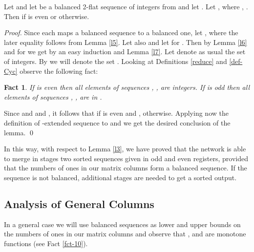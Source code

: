\documentclass{llncs}
\newtheorem{fact}[theorem]{Fact}
\begin{document}
\begin{lemma}
Let  and let  be a balanced
2-flat sequence of integers from  and let
. Let , where , . Then 
 if  is even or  otherwise.
\end{lemma}
\begin{proof}
Since each  maps a balanced sequence to a balanced one, let , where the later
equality follows from Lemma \ref{l5}. Let also  and let 
for . Then  by Lemma \ref{l6}
and for  we get  by an easy
induction and Lemma \ref{l7}. Let  denote as usual the set of 
integers. By  we will denote the set 
. Looking at Definitions \ref{reduce} and 
\ref{def-Cyc} observe the 
following fact:
\begin{fact}
If  is even then all elements of sequences , , are integers. If  is odd then  all elements of sequences 
, , are in .
\end{fact}
Since  and  and , it follows that  if  is 
even and  , otherwise. Applying now 
the definition of -extended sequence to  and  
we get the desired conclusion of the lemma. \qed
\end{proof}

In this way, with respect to Lemma \ref{l3}, we have proved that the network 
 is able to merge in  stages two sorted sequences given in odd 
and even registers, provided that the numbers of ones in our matrix columns 
form a balanced sequence. If the sequence is not balanced,  additional 
stages are needed to get a sorted output.

\subsection{Analysis of General Columns}

In a general case we will use balanced sequences as lower and upper bounds on
the numbers of ones in our matrix columns and observe that , 
and  are monotone functions (see Fact \ref{fct-10}).
\end{document}
